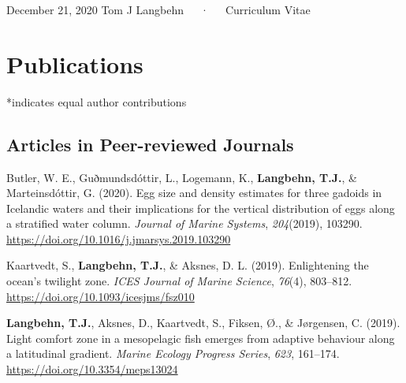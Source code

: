 \documentclass[11pt, a4paper]{awesome-cv}
\begin{document}
\makecvheader

\makecvfooter
  {December 21, 2020}
    {Tom J Langbehn~~~·~~~Curriculum Vitae}
  {\thepage}





\hypertarget{publications}{%
\section{Publications}\label{publications}}

*indicates equal author contributions

\hypertarget{articles-in-peer-reviewed-journals}{%
\subsection{Articles in Peer-reviewed
Journals}\label{articles-in-peer-reviewed-journals}}

\begingroup
\setlength{\parindent}{-0.5in}
\setlength{\leftskip}{0.5in}

\hypertarget{refs_journals}{}
\leavevmode\hypertarget{ref-Butler2020}{}%
Butler, W. E., Guðmundsdóttir, L., Logemann, K.,
\textbf{Langbehn, T.J.}, \& Marteinsdóttir, G. (2020). Egg size and
density estimates for three gadoids in Icelandic waters and their
implications for the vertical distribution of eggs along a stratified
water column. \emph{Journal of Marine Systems}, \emph{204}(2019),
103290. \url{https://doi.org/10.1016/j.jmarsys.2019.103290}

\leavevmode\hypertarget{ref-Kaartvedt2019b}{}%
Kaartvedt, S., \textbf{Langbehn, T.J.}, \& Aksnes, D. L. (2019).
Enlightening the ocean's twilight zone. \emph{ICES Journal of Marine
Science}, \emph{76}(4), 803--812.
\url{https://doi.org/10.1093/icesjms/fsz010}

\leavevmode\hypertarget{ref-Langbehn2019a}{}%
\textbf{Langbehn, T.J.}, Aksnes, D., Kaartvedt, S., Fiksen, Ø., \&
Jørgensen, C. (2019). Light comfort zone in a mesopelagic fish emerges
from adaptive behaviour along a latitudinal gradient. \emph{Marine
Ecology Progress Series}, \emph{623}, 161--174.
\url{https://doi.org/10.3354/meps13024}
\end{document}
